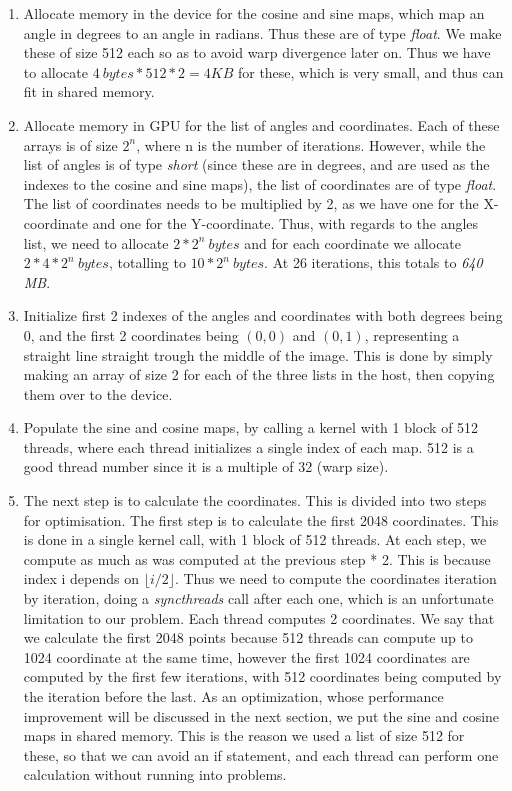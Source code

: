 \begin{enumerate}
	\item Allocate memory in the device for the cosine and sine maps, which map an angle in degrees to an angle in radians. Thus these are of type \textit{float}. We make these of size 512 each so as to avoid warp divergence later on. Thus we have to allocate $4\ bytes * 512 * 2 = 4KB$ for these, which is very small, and thus can fit in shared memory.
	
	\item Allocate memory in GPU for the list of angles and coordinates. Each of these arrays is of size $2^n$, where n is the number of iterations. However, while the list of angles is of type \textit{short} (since these are in degrees, and are used as the indexes to the cosine and sine maps), the list of coordinates are of type \textit{float}. The list of coordinates needs to be multiplied by 2, as we have one for the X-coordinate and one for the Y-coordinate. Thus, with regards to the angles list, we need to allocate $2*2^n\ bytes$ and for each coordinate we allocate $2*4*2^n\ bytes$, totalling to $10*2^n\ bytes$. At 26 iterations, this totals to \textit{640 MB}.
	
	\item Initialize first 2 indexes of the angles and coordinates with both degrees being 0, and the first 2 coordinates being $(0,0)$ and $(0,1)$, representing a straight line straight trough the middle of the image. This is done by simply making an array of size 2 for each of the three lists in the host, then copying them over to the device.
	
	\item Populate the sine and cosine maps, by calling a kernel with 1 block of 512 threads, where each thread initializes a single index of each map. 512 is a good thread number since it is a multiple of 32 (warp size).
	
	\item The next step is to calculate the coordinates. This is divided into two steps for optimisation. The first step is to calculate the first 2048 coordinates. This is done in a single kernel call, with 1 block of 512 threads. At each step, we compute as much as was computed at the previous step * 2. This is because index i depends on $\lfloor i/2 \rfloor$. Thus we need to compute the coordinates iteration by iteration, doing a \textit{syncthreads} call after each one, which is an unfortunate limitation to our problem. Each thread computes 2 coordinates. We say that we calculate the first 2048 points because 512 threads can compute up to 1024 coordinate at the same time, however the first 1024 coordinates are computed by the first few iterations, with 512 coordinates being computed by the iteration before the last. As an optimization, whose performance improvement will be discussed in the next section, we put the sine and cosine maps in shared memory. This is the reason we used a list of size 512 for these, so that we can avoid an if statement, and each thread can perform one calculation without running into problems.
	

\end{enumerate}
